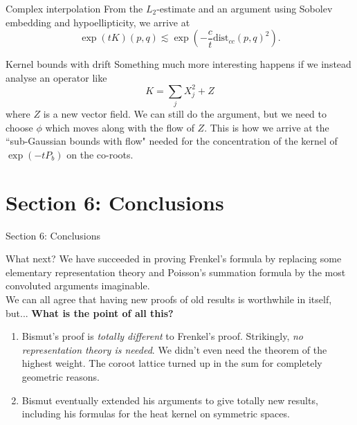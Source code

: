 \documentclass{beamer}
\numberwithin{equation}{section}
\theoremstyle{plain}
\theoremstyle{plain}
\theoremstyle{definition}
\theoremstyle{plain}
\theoremstyle{plain}
\theoremstyle{definition}
\begin{document}
\begin{frame}{Complex interpolation}
From the $L_2$-estimate and an argument using Sobolev embedding and hypoellipticity, we arrive at
\[
    \exp(tK)(p,q) \lesssim \exp(-\frac{c}{t}\mathrm{dist}_{cc}(p,q)^2).
\]
\end{frame}

\begin{frame}{Kernel bounds with drift}
    Something much more interesting happens if we instead analyse an operator like
    \[
        K = \sum_{j} X_j^2 + Z
    \]
    where $Z$ is a new vector field. We can still do the argument, but we need to choose $\phi$ which moves along with the flow of $Z.$ This is how we arrive at the ``sub-Gaussian bounds with flow" needed for the concentration of the kernel of $\exp(-tP_b)$ on the co-roots.
\end{frame}

\section{Section 6: Conclusions}

\begin{frame}
  \Huge{Section 6: Conclusions}
\end{frame}

\begin{frame}{What next?}
  We have succeeded in proving Frenkel's formula by replacing some elementary representation theory and Poisson's summation formula by the most convoluted arguments imaginable. \\
  
  We can all agree that having new proofs of old results is worthwhile in itself, but...
  \textbf{What is the point of all this?}
  \begin{enumerate}
    \item{} Bismut's proof is \emph{totally different} to Frenkel's proof. Strikingly, \emph{no representation theory is needed}. We didn't even need the theorem of the highest weight. The coroot lattice turned up in the sum for completely geometric reasons.
    \item{} Bismut eventually extended his arguments to give totally new results, including his formulas for the heat kernel on symmetric spaces.
  \end{enumerate}
\end{frame}


\begin{frame}
\end{frame}
\end{document}
